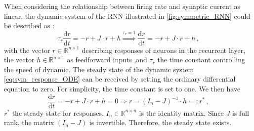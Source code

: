 \documentclass[11pt]{article}
\begin{document}
	When considering the relationship between firing rate and synaptic current as linear, the dynamic system of the RNN illustrated in \ref{fig:symmetric_RNN} could be described as \cite{dayan2005theoretical}:
		\begin{equation} \label{eq:sym_response_ODE}
			\tau_r \frac{\mathrm{d} r}{\mathrm{d} t} = -r + J \cdot r + h \overset{\tau_r = 1}{\Rightarrow} \frac{\mathrm{d} r}{\mathrm{d} t} = -r + J \cdot r + h\, , 
		\end{equation}
	with the vector $r \in \mathbb{R}^{n \times 1}$ describing responses of neurons in the recurrent layer, the vector $h \in \mathbb{R}^{n \times 1}$ as feedforward inputs ,and $\tau_r$ the time constant controlling the speed of dynamic. 
	The steady state of the dynamic system \ref{eq:sym_response_ODE} can be received by setting the ordinary differential equation to zero. For simplicity, the time constant is set to one. We then have
		\begin{equation} \label{eq:steady_state}
			\frac{\mathrm{d} r}{\mathrm{d} t} = -r + J \cdot r + h = 0 \Rightarrow r = (I_n - J)^{-1} \cdot h =: r^* \, ,
		\end{equation}
	$r^*$ the steady state for responses. $I_n \in \mathbb{R}^{n \times n}$ is the identity matrix. Since $J$ is full rank, the matrix $(I_n - J)$ is invertible. Therefore, the steady state exists.
	
\end{document}
